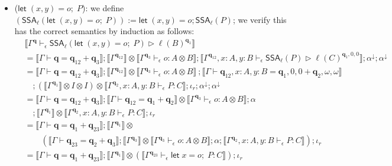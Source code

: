 \documentclass[acmsmall,screen,anonymous,review]{acmart}
\newcommand{\mb}[1]{\ensuremath{\mathbf{#1}}}
\newcommand{\ms}[1]{\ensuremath{\mathsf{#1}}}
\newcommand{\letexpr}[3]{\ensuremath{\ms{let}\;#1 = #2;\;#3}}
\newcommand{\letstmt}[3]{\ensuremath{\ms{let}\;#1 = #2; #3}}
\newcommand{\qsp}[4]{#1 \vdash #2 = #3 + #4}
\newcommand{\hasty}[4]{#1 \vdash_{#2} #3: {#4}}
\newcommand{\haslb}[4]{#1 \vdash_{#2} #3 \rhd #4}
\newcommand{\tossa}[2]{\ms{SSA}_{#1}(#2)}
\newcommand{\dnt}[1]{\llbracket{#1}\rrbracket}
\begin{document}
\begin{itemize}
\begin{align*}
    ; \dnt{\Gamma^{\mb{q}_1}} \otimes (
      \dnt{\hasty{\Gamma^{\mb{q}_{23}}}{\epsilon}{\letexpr{x}{o}{P}}{B}}
    )
    ; \iota_r
  \end{align*}
  as desired.
  \item ($\letexpr{(x, y)}{o}{P}$): we define
  $(\tossa{\ell}{\letexpr{(x, y)}{o}{P}}) := \letstmt{(x, y)}{o}{\tossa{\ell}{P}}$; we verify this
  has the correct semantics by induction as follows:
  \begin{align*}
  & \dnt{\haslb{\Gamma^{\mb{q}}}{\epsilon}
    {\tossa{\ell}{\letexpr{(x, y)}{o}{P}}}{\ell(B)^{\mb{q}_1}}} \\
  & = \dnt{\qsp{\Gamma}{\mb{q}}{\mb{q}_{12}}{\mb{q}_3}} 
    ; \dnt{\Gamma^{\mb{q}_{12}}} \otimes \dnt{\hasty{\Gamma^{\mb{q}_3}}{\epsilon}{o}{A \otimes B}}
    ; \dnt{\haslb{\Gamma^{\mb{q}_{12}}, x : A, y : B}{\epsilon}{\tossa{\ell}{P}}
      {\ell(C)^{\mb{q}_1, 0, 0}}}
    ; \alpha^\downarrow ; \alpha^\downarrow \\
  & = \dnt{\qsp{\Gamma}{\mb{q}}{\mb{q}_{12}}{\mb{q}_3}} 
    ; \dnt{\Gamma^{\mb{q}_{12}}} \otimes \dnt{\hasty{\Gamma^{\mb{q}_3}}{\epsilon}{o}{A \otimes B}}\
    ; \dnt{\qsp{\Gamma}{\mb{q}_{12}, x : A, y : B}{\mb{q}_1, 0, 0}{\mb{q}_2, \omega, \omega}}
  \\ & \quad
    ; (\dnt{\Gamma^{\mb{q}_1}} \otimes I \otimes I) \otimes 
      \dnt{\hasty{\Gamma^{\mb{q}_2}, x : A, y : B}{\epsilon}{P}{C}}
    ; \iota_r
    ; \alpha^\downarrow
    ; \alpha^\downarrow \\ 
  & = \dnt{\qsp{\Gamma}{\mb{q}}{\mb{q}_{12}}{\mb{q}_3}} 
    ; \dnt{\qsp{\Gamma}{\mb{q}_{12}}{\mb{q}_1}{\mb{q}_2}} 
      \otimes \dnt{\hasty{\Gamma^{\mb{q}_3}}{\epsilon}{o}{A \otimes B}}
    ; \alpha  \\ & \quad
    ; \dnt{\Gamma^{\mb{q}_1}} \otimes 
      \dnt{\hasty{\Gamma^{\mb{q}_2}, x : A, y : B}{\epsilon}{P}{C}}
    ; \iota_r \\
  & = \dnt{\qsp{\Gamma}{\mb{q}}{\mb{q}_1}{\mb{q}_{23}}}
    ; \dnt{\Gamma^{\mb{q}_1}} \otimes \\ & \qquad (
      \dnt{\qsp{\Gamma}{\mb{q}_{23}}{\mb{q}_2}{\mb{q}_3}}
      ; \dnt{\Gamma^{\mb{q}_{3}}} \otimes \dnt{\hasty{\Gamma^{\mb{q}_3}}{\epsilon}{o}{A \otimes B}}
      ; \alpha
      ; \dnt{\hasty{\Gamma^{\mb{q}_2}, x : A, y : B}{\epsilon}{P}{C}}
    )
    ; \iota_r \\
  & = \dnt{\qsp{\Gamma}{\mb{q}}{\mb{q}_1}{\mb{q}_{23}}}
    ; \dnt{\Gamma^{\mb{q}_1}} \otimes (
      \dnt{\hasty{\Gamma^{\mb{q}_{23}}}{\epsilon}{\letexpr{x}{o}{P}}{C}}
    )
    ; \iota_r

\end{align*}
\end{itemize}
\end{document}
